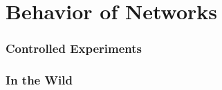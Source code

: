 \section{Behavior of Networks}

\subsubsection{Controlled Experiments}

\subsubsection{In the Wild}
